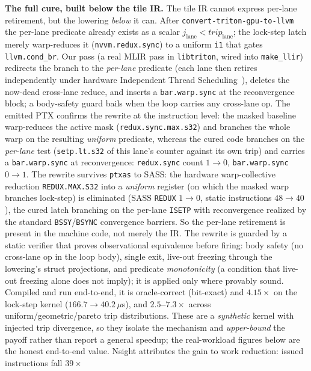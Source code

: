 \documentclass[manuscript,review,anonymous]{acmart}
\begin{document}
\textbf{The full cure, built below the tile IR.} The tile IR cannot express per-lane retirement, but the
lowering \emph{below} it can. After \texttt{convert-triton-gpu-to-llvm} the per-lane predicate already
exists as a scalar $j_{\mathrm{lane}}<\mathit{trip}_{\mathrm{lane}}$; the lock-step latch merely
warp-reduces it (\texttt{nvvm.redux.sync}) to a uniform \texttt{i1} that gates \texttt{llvm.cond\_br}. Our
pass (a real MLIR pass in \texttt{libtriton}, wired into \texttt{make\_llir}) redirects the branch to the
\emph{per-lane} predicate (each lane then retires independently under hardware Independent Thread Scheduling~\cite{its2017}), deletes the now-dead cross-lane reduce, and inserts a \texttt{bar.warp.sync} at the
reconvergence block; a body-safety guard bails when the loop carries any cross-lane op. The emitted PTX confirms the rewrite at the instruction level: the masked baseline warp-reduces the active mask (\texttt{redux.sync.max.s32}) and branches the whole warp on the resulting \emph{uniform} predicate, whereas the cured code branches on the \emph{per-lane} test (\texttt{setp.lt.s32} of this lane's counter against its own trip) and carries a \texttt{bar.warp.sync} at reconvergence: \texttt{redux.sync} count $1\!\rightarrow\!0$, \texttt{bar.warp.sync} $0\!\rightarrow\!1$. The rewrite survives \texttt{ptxas} to SASS: the hardware warp-collective reduction \texttt{REDUX.MAX.S32} into a \emph{uniform} register (on which the masked warp branches lock-step) is eliminated (SASS \texttt{REDUX} $1\!\rightarrow\!0$, static instructions $48\!\rightarrow\!40$), the cured latch branching on the per-lane \texttt{ISETP} with reconvergence realized by the standard \texttt{BSSY}/\texttt{BSYNC} convergence barriers. So the per-lane retirement is present in the machine code, not merely the IR. The rewrite is guarded by a static verifier that proves observational equivalence before firing: body safety (no cross-lane op in the loop body), single exit, live-out freezing through the lowering's struct projections, and predicate \emph{monotonicity} (a condition that live-out freezing alone does not imply); it is applied only where provably sound. Compiled and run
end-to-end, it is oracle-correct (bit-exact) and \textbf{$4.15\times$} on the lock-step kernel
($166.7\rightarrow40.2\,\mu$s), and \textbf{$2.5$--$7.3\times$} across uniform/geometric/pareto trip
distributions. These are a \emph{synthetic} kernel with injected trip divergence, so they isolate the
mechanism and \emph{upper-bound} the payoff rather than report a general speedup; the real-workload
figures below are the honest end-to-end value. Nsight attributes the gain to work reduction: issued instructions fall \textbf{$39\times$}
\end{document}
